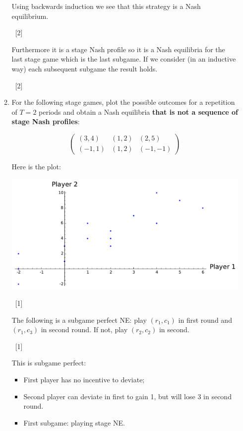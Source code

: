 \documentclass[12pt,a4paper]{article}
\begin{document}
\begin{enumerate}
\begin{enumerate}
            Using backwards induction we see that this strategy is a Nash equilibrium.

        ~\hfill[2]

            Furthermore it is a stage Nash profile so it is a Nash equilibria for the last
            stage game which is the last subgame. If we consider (in an inductive way) each
            subsequent subgame the result holds.

        ~\hfill[2]

        \item For the following stage games, plot the possible outcomes for a
            repetition of \(T=2\) periods and obtain a Nash equilibria
            \textbf{that is not a sequence of stage Nash profiles}:

            \[
                \begin{pmatrix}
                    (3,4) & (1,2) & (2,5)\\
                    (-1,1) & (1,2) & (-1,-1)
                \end{pmatrix}
            \]

            Here is the plot:

            \begin{center}
                \includegraphics[width=.6\textwidth]{plots/resit-sol-2013-2014-plt01.pdf}
            \end{center}

            ~\hfill[1]

            The following is a subgame perfect NE: play \((r_1, c_1)\) in first
            round and \((r_1, c_3)\) in second round. If not, play \((r_2, c_2)\) in
            second.

            ~\hfill[1]

            This is subgame perfect:

            \begin{itemize}
                \item First player has no incentive to deviate;
                \item Second player can deviate in first to gain 1, but will
                    lose 3 in second round.
                \item First subgame: playing stage NE.
            \end{itemize}


\end{enumerate}
\end{enumerate}
\end{document}
